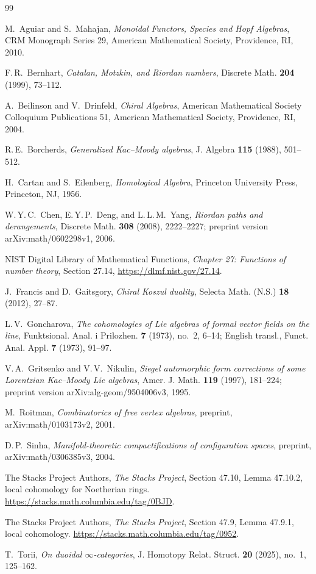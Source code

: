 \documentclass[11pt,reqno]{amsart}
\theoremstyle{definition}
\theoremstyle{remark}
\begin{document}
\begin{thebibliography}{99}

M.~Aguiar and S.~Mahajan,
\emph{Monoidal Functors, Species and Hopf Algebras},
CRM Monograph Series 29, American Mathematical Society, Providence,
RI, 2010.

F.\,R.~Bernhart,
\emph{Catalan, Motzkin, and Riordan numbers},
Discrete Math. \textbf{204} (1999), 73--112.

A.~Beilinson and V.~Drinfeld,
\emph{Chiral Algebras},
American Mathematical Society Colloquium Publications 51,
American Mathematical Society, Providence, RI, 2004.

R.\,E.~Borcherds,
\emph{Generalized Kac--Moody algebras},
J. Algebra \textbf{115} (1988), 501--512.

H.~Cartan and S.~Eilenberg,
\emph{Homological Algebra},
Princeton University Press, Princeton, NJ, 1956.

W.\,Y.\,C.~Chen, E.\,Y.\,P.~Deng, and L.\,L.\,M.~Yang,
\emph{Riordan paths and derangements},
Discrete Math. \textbf{308} (2008), 2222--2227;
preprint version arXiv:math/0602298v1, 2006.

NIST Digital Library of Mathematical Functions,
\emph{Chapter 27: Functions of number theory},
Section 27.14, \url{https://dlmf.nist.gov/27.14}.

J.~Francis and D.~Gaitsgory,
\emph{Chiral Koszul duality},
Selecta Math. (N.S.) \textbf{18} (2012), 27--87.

L.\,V.~Goncharova,
\emph{The cohomologies of Lie algebras of formal vector fields on the
line},
Funktsional. Anal. i Prilozhen. \textbf{7} (1973), no.~2, 6--14;
English transl., Funct. Anal. Appl. \textbf{7} (1973), 91--97.

V.\,A.~Gritsenko and V.\,V.~Nikulin,
\emph{Siegel automorphic form corrections of some Lorentzian
Kac--Moody Lie algebras},
Amer. J. Math. \textbf{119} (1997), 181--224;
preprint version arXiv:alg-geom/9504006v3, 1995.

M.~Roitman,
\emph{Combinatorics of free vertex algebras},
preprint, arXiv:math/0103173v2, 2001.

D.\,P.~Sinha,
\emph{Manifold-theoretic compactifications of configuration spaces},
preprint, arXiv:math/0306385v3, 2004.

The Stacks Project Authors, \emph{The Stacks Project},
Section 47.10, Lemma 47.10.2, local cohomology for Noetherian rings.
\url{https://stacks.math.columbia.edu/tag/0BJD}.

The Stacks Project Authors, \emph{The Stacks Project},
Section 47.9, Lemma 47.9.1, local cohomology.
\url{https://stacks.math.columbia.edu/tag/0952}.

T.~Torii,
\emph{On duoidal \(\infty\)-categories},
J. Homotopy Relat. Struct. \textbf{20} (2025), no.~1, 125--162.

\end{thebibliography}
\end{document}
